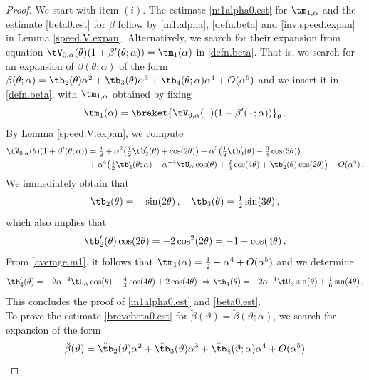 \documentclass[a4paper,reqno,10pt]{article}
\begin{document}
\begin{proof}
	We start with item $(i)$.   
    The estimate \eqref{m1alpha0.est} for $\tm_{1,\alpha}$ and the estimate \eqref{beta0.est} for $\beta$ follow by \eqref{m1.alpha}, \eqref{defn.beta} and \eqref{inv.speed.expan} in Lemma \ref{speed.V.expan}. 
    Alternatively, we search for their expansion from equation $\tV_{0,\alpha}(\theta)(1+\beta'(\theta;\alpha))=\tm_{1}(\alpha)$ in \eqref{defn.beta}. That is, we search for an expansion of $\beta(\theta;\alpha)$ of the form $\beta(\theta;\alpha)= \tb_{2}(\theta) \alpha^2 + \tb_{3}(\theta)\alpha^3 + \tb_{4}(\theta;\alpha)\alpha^4 + O(\alpha^5)$ and we insert it in \eqref{defn.beta}, with $\tm_{1,\alpha}$ obtained by fixing
    \begin{equation}\label{average.m1}
        \tm_{1}(\alpha) = \braket{\tV_{0,\alpha}(\,\cdot\,)(1+\beta'(\,\cdot\,;\alpha))}_{\theta} \,.
    \end{equation}
    By Lemma \ref{speed.V.expan}, we compute
    \begin{align}
        \tV_{0,\alpha}(\theta)(1+\beta'(\theta;\alpha)) & = \tfrac12 + \alpha^2 \big( \tfrac12 \tb_{2}'(\theta) + \cos(2\theta) \big)+ \alpha^3\big( \tfrac12 \tb_{3}'(\theta) - \tfrac34 \cos(3\theta) \big) \\
        & +\alpha^4 \big( \tfrac12 \tb_{4}'(\theta;\alpha) +\alpha^{-4}\tU_{\alpha}\cos(\theta) +\tfrac{2}{3}\cos(4\theta) + \tb_{2}'(\theta) \cos(2\theta) \big) + O(\alpha^5)\,.
    \end{align}
    We immediately obtain that
    \begin{equation}
        \tb_{2}(\theta) = - \sin(2\theta) \,, \quad \tb_{3}(\theta) = \tfrac12 \sin(3\theta) \,,
    \end{equation}
    which also implies that 
    $$\tb_{2}'(\theta)\cos(2\theta) = - 2 \cos^2(2\theta)=-1-\cos(4\theta)\,.
    $$
    From \eqref{average.m1}, it follows that $\tm_{1}(\alpha) = \tfrac12 - \alpha^4 + O(\alpha^5) $ and we determine
    \begin{equation}
        \tb_{4}'(\theta)= -2\alpha^{-4}\tU_{\alpha} \cos(\theta) - \tfrac{4}{3}\cos(4\theta) + 2\cos(4\theta) \ \Rightarrow \tb_{4}(\theta) = -2\alpha^{-4}\tU_{\alpha} \sin(\theta) + \tfrac{1}{6} \sin(4\theta) \,.
    \end{equation}
    This concludes the proof of \eqref{m1alpha0.est} and \eqref{beta0.est}.
    \\
    To prove the estimate \eqref{brevebeta0.est} for $\breve{\beta}(\vartheta)=\breve{\beta}(\vartheta;\alpha)$, we search for expansion of the form $$\breve{\beta}(\vartheta)= \breve\tb_{2}(\vartheta) \alpha^2 + \breve\tb_{3}(\vartheta) \alpha^3 + \breve\tb_{4}(\vartheta;\alpha)\alpha^4 + O(\alpha^5)
$$
\end{proof}
\end{document}
